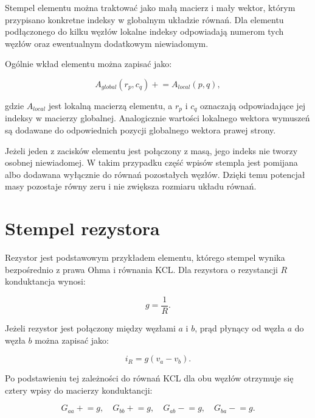 Stempel elementu można traktować jako małą macierz i mały wektor, którym przypisano konkretne indeksy w globalnym układzie równań. Dla elementu podłączonego do kilku węzłów lokalne indeksy odpowiadają numerom tych węzłów oraz ewentualnym dodatkowym niewiadomym.

Ogólnie wkład elementu można zapisać jako:

\begin{equation}
\label{eq:stamp-contribution}
A_{global}(r_p, c_q) \mathrel{+}= A_{local}(p, q),
\end{equation}

gdzie \(A_{local}\) jest lokalną macierzą elementu, a \(r_p\) i \(c_q\) oznaczają odpowiadające jej indeksy w macierzy globalnej. Analogicznie wartości lokalnego wektora wymuszeń są dodawane do odpowiednich pozycji globalnego wektora prawej strony.

Jeżeli jeden z zacisków elementu jest połączony z masą, jego indeks nie tworzy osobnej niewiadomej. W takim przypadku część wpisów stempla jest pomijana albo dodawana wyłącznie do równań pozostałych węzłów. Dzięki temu potencjał masy pozostaje równy zeru i nie zwiększa rozmiaru układu równań.

\section{Stempel rezystora}
\label{sec:stempel-rezystora}

Rezystor jest podstawowym przykładem elementu, którego stempel wynika bezpośrednio z prawa Ohma i równania KCL. Dla rezystora o rezystancji \(R\) konduktancja wynosi:

\begin{equation}
\label{eq:stamp-conductance}
g = \frac{1}{R}.
\end{equation}

Jeżeli rezystor jest połączony między węzłami \(a\) i \(b\), prąd płynący od węzła \(a\) do węzła \(b\) można zapisać jako:

\begin{equation}
\label{eq:stamp-resistor-current}
i_R = g(v_a - v_b).
\end{equation}

Po podstawieniu tej zależności do równań KCL dla obu węzłów otrzymuje się cztery wpisy do macierzy konduktancji:

\begin{equation}
\label{eq:stamp-resistor}
G_{aa} \mathrel{+}= g,\quad
G_{bb} \mathrel{+}= g,\quad
G_{ab} \mathrel{-}= g,\quad
G_{ba} \mathrel{-}= g.
\end{equation}

